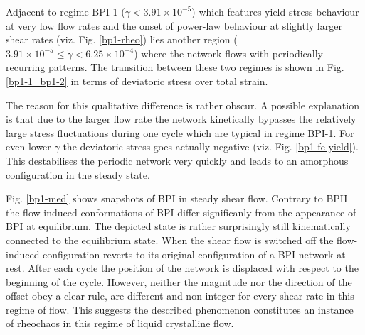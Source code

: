 \documentclass[aps,pre,reprint,superscriptaddress, twocolumn]{revtex4}
\newcommand{\e}[1]{\times10^{#1}}
\newcommand{\gd}{\dot{\gamma}}
\begin{document}
Adjacent to regime BPI-1 ($\gd<3.91\e{-5}$) which features yield stress 
behaviour at very low flow rates and the onset of power-law behaviour 
at slightly larger shear rates (viz. Fig. \ref{bp1-rheo}) lies another 
region ($3.91\e{-5}\le\gd< 6.25\e{-4}$) where the network flows with periodically 
recurring patterns. The transition between these two regimes is shown
in Fig. \ref{bp1-1_bp1-2} in terms of deviatoric stress over total strain. 

The reason for this qualitative difference is rather obscur. A possible 
explanation is that due to the larger flow rate the network kinetically 
bypasses the relatively large stress fluctuations during one cycle which
are typical in regime BPI-1. For even lower $\gd$ the deviatoric stress
goes actually negative (viz. Fig. \ref{bp1-fe-yield}). This destabilises
the periodic network very quickly and leads to an amorphous configuration
in the steady state.



Fig. \ref{bp1-med} shows snapshots of BPI in steady shear flow. 
Contrary to BPII the flow-induced conformations of BPI differ significanly 
from the appearance of BPI at equilibrium. The depicted 
state is rather surprisingly still kinematically connected to the equilibrium state.
When the shear flow is switched off the flow-induced configuration reverts
to its original configuration of a BPI network at rest.
After each cycle the position of the network is displaced with respect to the beginning of the cycle.
However, neither the magnitude nor the direction of the offset obey a clear rule,
are different and non-integer for every shear rate in this regime of flow. 
This suggests the described phenomenon constitutes an instance of rheochaos in this 
regime of liquid crystalline flow. 
\end{document}
